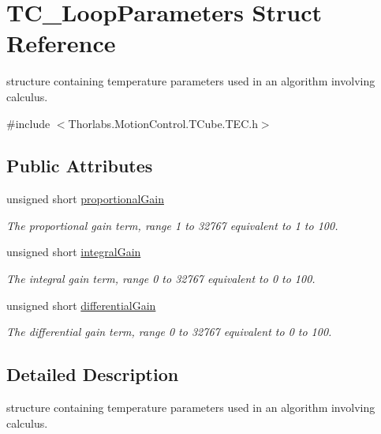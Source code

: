 \hypertarget{struct_t_c___loop_parameters}{}\section{T\+C\+\_\+\+Loop\+Parameters Struct Reference}
\label{struct_t_c___loop_parameters}


structure containing temperature parameters used in an algorithm involving calculus.  




{\ttfamily \#include $<$Thorlabs.\+Motion\+Control.\+T\+Cube.\+T\+E\+C.\+h$>$}

\subsection*{Public Attributes}
\begin{DoxyCompactItemize}
\item 
unsigned short \hyperlink{struct_t_c___loop_parameters_abda629ff9a082cf2998db53221d403bd}{proportional\+Gain}
\begin{DoxyCompactList}\small\item\em The proportional gain term, range 1 to 32767 equivalent to 1 to 100. \end{DoxyCompactList}\item 
unsigned short \hyperlink{struct_t_c___loop_parameters_ab773223778f0ad09b360c222e410ed8f}{integral\+Gain}
\begin{DoxyCompactList}\small\item\em The integral gain term, range 0 to 32767 equivalent to 0 to 100. \end{DoxyCompactList}\item 
unsigned short \hyperlink{struct_t_c___loop_parameters_acb876b6c832cb9ab6cfcd1c07e2a1776}{differential\+Gain}
\begin{DoxyCompactList}\small\item\em The differential gain term, range 0 to 32767 equivalent to 0 to 100. \end{DoxyCompactList}\end{DoxyCompactItemize}


\subsection{Detailed Description}
structure containing temperature parameters used in an algorithm involving calculus. 



